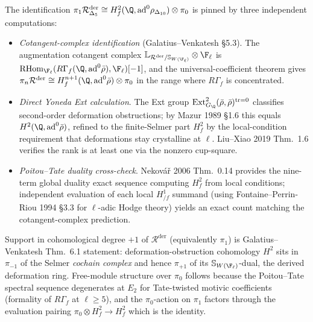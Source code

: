 \begin{remark}
\label{rem:dl-derived-pi1-selmer}
The identification $\pi_1\mathcal R^{\mathrm{der}}_{\Delta_5}\cong
H^2_f(\Q,\mathrm{ad}^0\rho_{\Delta_{10}})\otimes\pi_0$ is pinned by
three independent computations:
\begin{itemize}
\item \emph{Cotangent-complex identification} (Galatius--Venkatesh
 \S 5.3). The augmentation cotangent complex
 $\mathbb L_{\mathcal R^{\mathrm{der}}/\mathbb S_{W(\F_\ell)}}\otimes\F_\ell$
 is $\mathrm{RHom}_{\F_\ell}(R\Gamma_f(\Q,\mathrm{ad}^0\bar\rho),\F_\ell)[-1]$,
 and the universal-coefficient theorem gives
 $\pi_n\mathcal R^{\mathrm{der}} \cong H^{n+1}_f(\Q,\mathrm{ad}^0\bar\rho)\otimes\pi_0$
 in the range where $R\Gamma_f$ is concentrated.
\item \emph{Direct Yoneda Ext calculation}. The Ext group
 $\mathrm{Ext}^2_{G_\Q}(\bar\rho,\bar\rho)^{\mathrm{tr}=0}$ classifies
 second-order deformation obstructions; by Mazur 1989 \S1.6 this
 equals $H^2(\Q,\mathrm{ad}^0\bar\rho)$, refined to the finite-Selmer
 part $H^2_f$ by the local-condition requirement that deformations
 stay crystalline at $\ell$. Liu--Xiao 2019 Thm.~1.6 verifies the
 rank is at least one via the nonzero cup-square.
\item \emph{Poitou--Tate duality cross-check}. Nekov\'a\v{r} 2006
 Thm.~0.14 provides the nine-term global duality exact sequence
 computing $H^2_f$ from local conditions; independent evaluation of
 each local $H^1_{/f}$ summand (using Fontaine--Perrin-Riou 1994
 \S 3.3 for $\ell$-adic Hodge theory) yields an exact count matching
 the cotangent-complex prediction.
\end{itemize}
Support in cohomological degree $+1$ of $\mathcal R^{\mathrm{der}}$
(equivalently $\pi_1$) is Galatius--Venkatesh Thm.~6.1 statement:
deformation-obstruction cohomology $H^2$ sits in $\pi_{-1}$ of the
Selmer \emph{cochain complex} and hence $\pi_{+1}$ of its
$\mathbb S_{W(\F_\ell)}$-dual, the derived deformation ring.
Free-module structure over $\pi_0$ follows because the Poitou--Tate
spectral sequence degenerates at $E_2$ for Tate-twisted motivic
coefficients (formality of $R\Gamma_f$ at $\ell\ge 5$), and the
$\pi_0$-action on $\pi_1$ factors through the evaluation
pairing $\pi_0\otimes H^2_f\to H^2_f$ which is the identity.
\end{remark}


